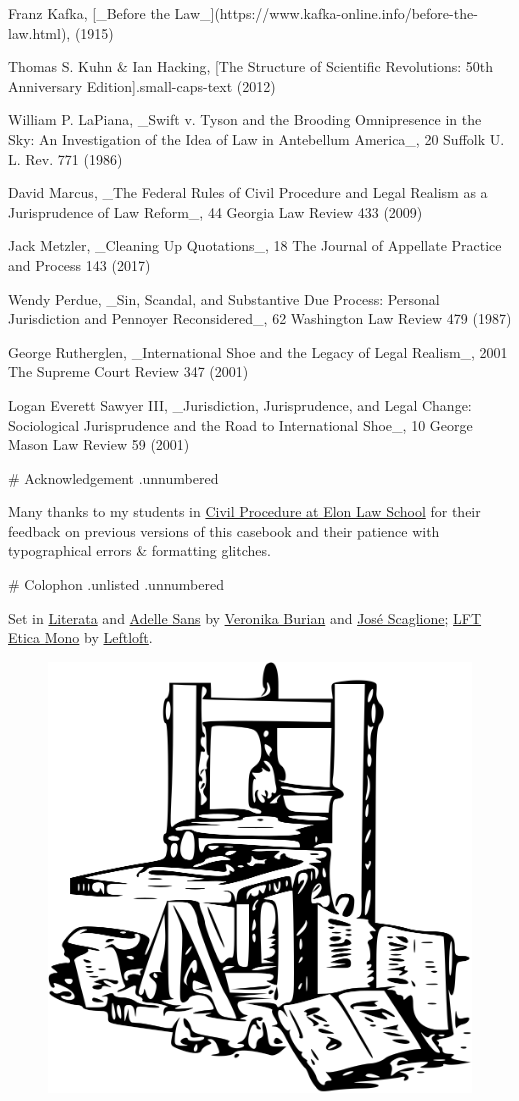 Franz Kafka, [_Before the Law_](https://www.kafka-online.info/before-the-law.html), (1915) 

Thomas S. Kuhn & Ian Hacking, [The Structure of Scientific Revolutions: 50th Anniversary Edition]{.small-caps-text} (2012)

William P. LaPiana, _Swift v. Tyson and the Brooding Omnipresence in the Sky: An Investigation of the Idea of Law in Antebellum America_, 20 Suffolk U. L. Rev. 771 (1986)

David Marcus, _The Federal Rules of Civil Procedure and Legal Realism as a Jurisprudence of Law Reform_, 44 Georgia Law Review 433 (2009)

Jack Metzler, _Cleaning Up Quotations_, 18 The Journal of Appellate Practice and Process 143 (2017)

Wendy Perdue, _Sin, Scandal, and Substantive Due Process: Personal Jurisdiction and Pennoyer Reconsidered_, 62 Washington Law Review 479 (1987)

George Rutherglen, _International Shoe and the Legacy of Legal Realism_, 2001 The Supreme Court Review 347 (2001)

Logan Everett Sawyer III, _Jurisdiction, Jurisprudence, and Legal Change: Sociological Jurisprudence and the Road to International Shoe_, 10 George Mason Law Review 59 (2001)

\clearpage

# Acknowledgement {.unnumbered}

Many thanks to my students in \href{https://www.emfink.net/CivPro/}{Civil Procedure at Elon Law School} for their feedback on previous versions of this casebook and their patience with typographical errors & formatting glitches. 

\clearpage

# Colophon {.unlisted .unnumbered}

Set in \href{https://www.type-together.com/literata-font/}{Literata} and \href{https://www.type-together.com/adelle-sans-font/}{Adelle Sans} by \href{https://www.type-together.com/veronika-burian/}{Veronika Burian} and \href{https://www.type-together.com/jose-scaglione/}{José Scaglione}; \href{https://www.type-together.com/lft-etica-mono-font/}{LFT Etica Mono} by \href{https://www.type-together.com/leftloft/}{Leftloft}.

\begin{figure}[h!]
  \includegraphics[width=0.3\linewidth]{img/gutenberg_press.png}
\end{figure}